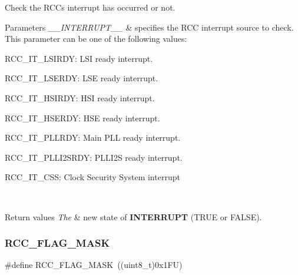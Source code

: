 Check the R\+CC\textquotesingle{}s interrupt has occurred or not. 


\begin{DoxyParams}{Parameters}
{\em \+\_\+\+\_\+\+I\+N\+T\+E\+R\+R\+U\+P\+T\+\_\+\+\_\+} & specifies the R\+CC interrupt source to check. This parameter can be one of the following values\+: \begin{DoxyItemize}
\item R\+C\+C\+\_\+\+I\+T\+\_\+\+L\+S\+I\+R\+DY\+: L\+SI ready interrupt. \item R\+C\+C\+\_\+\+I\+T\+\_\+\+L\+S\+E\+R\+DY\+: L\+SE ready interrupt. \item R\+C\+C\+\_\+\+I\+T\+\_\+\+H\+S\+I\+R\+DY\+: H\+SI ready interrupt. \item R\+C\+C\+\_\+\+I\+T\+\_\+\+H\+S\+E\+R\+DY\+: H\+SE ready interrupt. \item R\+C\+C\+\_\+\+I\+T\+\_\+\+P\+L\+L\+R\+DY\+: Main P\+LL ready interrupt. \item R\+C\+C\+\_\+\+I\+T\+\_\+\+P\+L\+L\+I2\+S\+R\+DY\+: P\+L\+L\+I2S ready interrupt. \item R\+C\+C\+\_\+\+I\+T\+\_\+\+C\+SS\+: Clock Security System interrupt \end{DoxyItemize}
\\
\hline
\end{DoxyParams}

\begin{DoxyRetVals}{Return values}
{\em The} & new state of {\bfseries I\+N\+T\+E\+R\+R\+U\+PT} (T\+R\+UE or F\+A\+L\+SE). \\
\hline
\end{DoxyRetVals}
\mbox{\label{group___r_c_c___flags___interrupts___management_ga80017c6bf8a5c6f53a1a21bb8db93a82}} 
\subsubsection{\texorpdfstring{R\+C\+C\+\_\+\+F\+L\+A\+G\+\_\+\+M\+A\+SK}{RCC\_FLAG\_MASK}}
{\footnotesize\ttfamily \#define R\+C\+C\+\_\+\+F\+L\+A\+G\+\_\+\+M\+A\+SK~((uint8\+\_\+t)0x1\+F\+U)}




